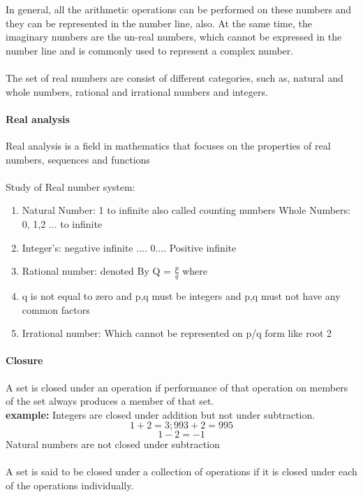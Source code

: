 \documentclass[15]{article}
\begin{document}
In general, all the arithmetic operations can be performed on these numbers and they can be represented in the number line, also. At the same time, the imaginary numbers are the un-real numbers, which cannot be expressed in the number line and is commonly used to represent a complex number. 
\\
\\
The set of real numbers are consist of different categories, such as, natural and whole numbers, rational and irrational numbers and integers.


\paragraph{Real analysis} Real analysis is a field in mathematics that focuses on the properties of real numbers, sequences and functions
\\
\\
Study of Real number system:
\begin{enumerate}

\item Natural Number: 1 to infinite also called counting numbers
 Whole Numbers: 0, 1,2 ... to infinite
\item Integer's:  negative infinite .... 0.... Positive infinite 
\item Rational number:  denoted By Q = $\frac{p}{q}$ where \item q is not equal to zero and p,q must be integers and p,q must not have any common factors
\item Irrational number: Which cannot be represented on p/q form like root 2

\end{enumerate}

\paragraph{Closure}
A set is closed under an operation if performance of that operation on members of the set always produces a member of that set.\\
\textbf{example:} Integers are closed under addition but not under subtraction.
$$ 1+2 = 3 ; 993+2 =  995 $$
$$ 1-2 = -1 $$ Natural numbers are not closed under subtraction   
\\
\\
 A set is said to be closed under a collection of operations if it is closed under each of the operations individually.
\end{document}
